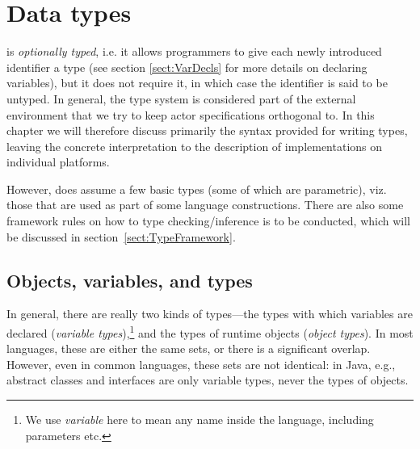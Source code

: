 
\chapter{Data types}\label{sect:Types}

\Cal is {\em optionally typed}, i.e. it
allows programmers to give each newly introduced identifier a type
(see section \ref{sect:VarDecls} for more details on declaring variables),
but it does not require it, in which case the identifier is said to be
untyped. In general, the type system is considered part of the
external environment that we try to keep \Cal actor specifications
orthogonal to. In this chapter we will therefore discuss primarily the
syntax provided for writing types, leaving the concrete interpretation
to the description of \Cal implementations on individual platforms.

However, \Cal does assume a few basic types  (some of which are parametric), viz. those that are used as
part of some language constructions. There are also some framework
rules on how to type checking/inference is to be conducted, which will
be discussed in section~\ref{sect:TypeFramework}.


\section{Objects, variables, and types}\label{sect:ObjectsVariablesTypes}

 
 
In general, there are really two kinds of types---the types with which
variables are declared ({\em variable types}),\footnote{We use {\em
    variable} here to mean any name inside the language, including
  parameters etc.} and the types of runtime objects ({\em object
  types}). In most languages, these are either the same sets, or there
is a significant overlap. However, even in common languages, these
sets are not identical: in Java, e.g., abstract classes and interfaces
are only variable types, never the types of objects.

